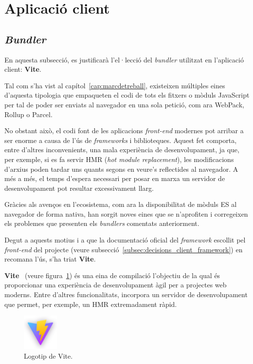 \documentclass[a4paper,12pt]{ThesisStyle}
\begin{document}
\section{Aplicació client}
\label{sec:decisions_client}

\subsection{\textit{Bundler}}
\label{subsec:decisions_client_bundler}

En aquesta subsecció, es justificarà l'el·lecció del \textit{bundler} utilitzat en l'aplicació client: \textbf{Vite}.

Tal com s'ha vist al capítol~\ref{cap:marcdetreball}, existeixen múltiples eines d'aquesta tipologia que empaqueten el codi de tots els fitxers o mòduls JavaScript per tal de poder ser enviats al navegador en una sola petició, com ara WebPack, Rollup o Parcel.

No obstant això, el codi font de les aplicacions \textit{front-end} modernes pot arribar a ser enorme a causa de l'ús de \textit{frameworks} i biblioteques. Aquest fet comporta, entre d'altres inconvenients, una mala experiència de desenvolupament, ja que, per exemple, si es fa servir HMR (\textit{hot module replacement}), les modificacions d'arxius poden tardar uns quants segons en veure's reflectides al navegador. A més a més, el temps d'espera necessari per posar en marxa un servidor de desenvolupament pot resultar excessivament llarg.

Gràcies als avenços en l'ecosistema, com ara la disponibilitat de mòduls ES al navegador de forma nativa, han sorgit noves eines que se n'aprofiten i corregeixen els problemes que presenten els \textit{bundlers} comentats anteriorment.

Degut a aquests motius i a que la documentació oficial del \textit{framework} escollit pel \textit{front-end} del projecte (veure subsecció~\ref{subsec:decisions_client_framework}) en recomana l'ús, s'ha triat \textbf{Vite}.

\textbf{Vite}~\cite{Vite} (veure figura~\ref{img:logo_vite}) és una eina de compilació l'objectiu de la qual és proporcionar una experiència de desenvolupament àgil per a projectes web moderns. Entre d'altres funcionalitats, incorpora un servidor de desenvolupament que permet, per exemple, un HMR extremadament ràpid.

\begin{figure}[H]
  \centering
  \includegraphics[width=0.16\textwidth]{assets/logos/Vite.png}
  \caption{\label{img:logo_vite}Logotip de Vite.}
\end{figure}
\end{document}
